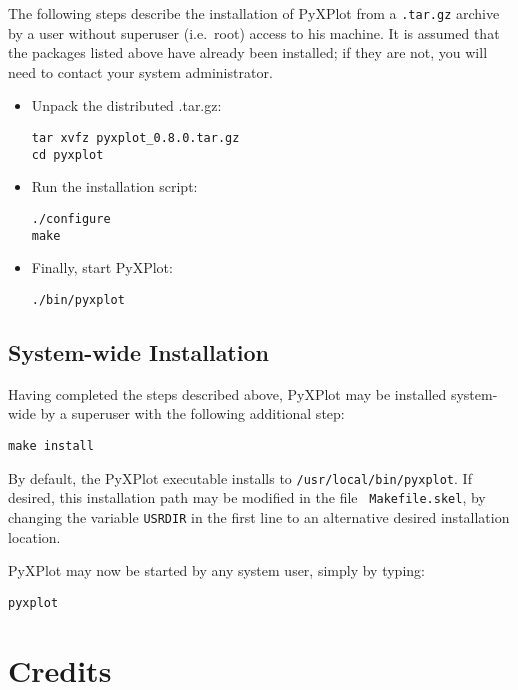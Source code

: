 The following steps describe the installation of PyXPlot from a {\tt .tar.gz}
archive by a user without superuser (i.e.\ root) access to his machine. It is
assumed that the packages listed above have already been installed; if they are
not, you will need to contact your system
administrator.

\begin{itemize}
\item Unpack the distributed .tar.gz:

\begin{verbatim}
tar xvfz pyxplot_0.8.0.tar.gz
cd pyxplot
\end{verbatim}

\item Run the installation script:

\begin{verbatim}
./configure
make
\end{verbatim}

\item Finally, start PyXPlot:

\begin{verbatim}
./bin/pyxplot
\end{verbatim}

\end{itemize}

\subsection{System-wide Installation}

Having completed the steps described above, PyXPlot may be installed
system-wide by a superuser with the following additional
step:

\begin{verbatim}
make install
\end{verbatim}

By default, the PyXPlot executable installs to {\tt /usr/local/bin/pyxplot}.
If desired, this installation path may be modified in the file {\tt
Makefile.skel}, by changing the variable {\tt USRDIR} in the first line to an
alternative desired installation location.

PyXPlot may now be started by any system user, simply by typing:

\begin{verbatim}
pyxplot
\end{verbatim}

\section{Credits}

